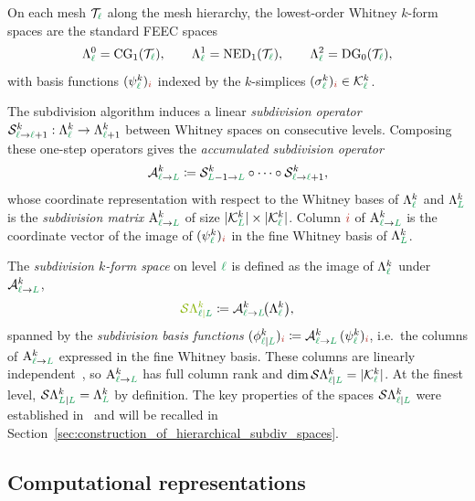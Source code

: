 \documentclass[a4paper, 12pt]{article}
\newcommand{\guidance}[1]{{\color{lime!70!black} #1}}
\newcommand{\green}{\color{ForestGreen}}
\newcommand{\brickred}{\color{BrickRed}}
\newcommand{\T}{\mathcal{T}}
\newcommand{\K}{\mathcal{K}}
\newcommand{\simplexname}{\sigma}
\newcommand{\simplex}[3]{\freeQ{\simplexname}{#1}{#2}{#3}}
\newcommand{\coarseIdxone}{{\brickred i}}
\renewcommand{\l}{{\green\ell}}
\renewcommand{\L}{{\green L}}
\newcommand{\constrQ}[5]{ ( {#1}^{#2}_{#3 \vert #4} )_{#5}} %
\newcommand{\freeQ}[4]{ ( {#1}^{#2}_{#3} )_{#4}}
\newcommand{\Sop}[3]{\mathcal{S}^{#1}_{{#2} \to {#3}}}
\newcommand{\Aop}[3]{\mathcal{A}^{#1}_{{#2} \to {#3}}}
\newcommand{\Amat}[3]{\mathbf{\mathrm{A}}^{#1}_{#2 \to #3}}
\newcommand{\FEECspace}[2]{\Lambda^{#1}_{#2}}
\newcommand{\FEECbasis}{\psi}
\newcommand{\SDFspace}[3]{\mathcal{S}\Lambda^{#1}_{#2 \vert #3}}
\newcommand{\SDFbasis}{\phi}
\newcommand{\sumdimlk}[2]{\vert \K^{#2}_{#1} \vert}
\theoremstyle{definition}
\theoremstyle{plain}
\numberwithin{equation}{section}
\begin{document}
On each mesh $\T_\l$ along the mesh hierarchy, the lowest-order Whitney $k$-form spaces are the standard FEEC spaces~\citep{Arnold.2006}
\begin{equation}
    \label{eq:whitney_spaces}
    \FEECspace{0}{\l} = \mathrm{CG}_1(\T_\l), \qquad \FEECspace{1}{\l} = \mathrm{NED}_1(\T_\l), \qquad \FEECspace{2}{\l} = \mathrm{DG}_0(\T_\l),
\end{equation}
with basis functions $\freeQ{\FEECbasis}{k}{\l}{\coarseIdxone}$ indexed by the $k$-simplices $\simplex{k}{\l}{\coarseIdxone} \in \K^k_\l$.

The subdivision algorithm induces a linear \emph{subdivision operator} $\Sop{k}{\l}{\l+1}: \FEECspace{k}{\l} \to \FEECspace{k}{\l+1}$ between Whitney spaces on consecutive levels. Composing these one-step operators gives the \emph{accumulated subdivision operator}
\begin{equation}
    \Aop{k}{\l}{\L} \coloneqq \Sop{k}{\L-1}{\L} \circ \cdots \circ \Sop{k}{\l}{\l+1},
\end{equation}
whose coordinate representation with respect to the Whitney bases of $\FEECspace{k}{\l}$ and $\FEECspace{k}{\L}$ is the \emph{subdivision matrix} $\Amat{k}{\l}{\L}$ of size $|\K^k_\L| \times |\K^k_\l|$. Column $\coarseIdxone$ of $\Amat{k}{\l}{\L}$ is the coordinate vector of the image of $\freeQ{\FEECbasis}{k}{\l}{\coarseIdxone}$ in the fine Whitney basis of $\FEECspace{k}{\L}$.

The \emph{subdivision $k$-form space} on level $\l$ is defined as the image of $\FEECspace{k}{\l}$ under $\Aop{k}{\l}{\L}$,
\begin{equation}
    \label{def:uniform_spaces_as_image_of_subdiv_operator}
    \guidance{\SDFspace{k}{\l}{\L}} \coloneqq \Aop{k}{\l}{\L}\!\big(\FEECspace{k}{\l}\big),
\end{equation}
spanned by the \emph{subdivision basis functions} $\constrQ{\SDFbasis}{k}{\l}{\L}{\coarseIdxone} \coloneqq \Aop{k}{\l}{\L}\, \freeQ{\FEECbasis}{k}{\l}{\coarseIdxone}$, i.e.\ the columns of $\Amat{k}{\l}{\L}$ expressed in the fine Whitney basis. \guidance{These columns are linearly independent~\citep{Piel.2026}, so $\Amat{k}{\l}{\L}$ has full column rank and $\dim \SDFspace{k}{\l}{\L} = \sumdimlk{\l}{k}$.} At the finest level, $\SDFspace{k}{\L}{\L} = \FEECspace{k}{\L}$ by definition. The key properties of the spaces $\SDFspace{k}{\l}{\L}$ were established in~\cite{Piel.2026} and will be recalled in Section~\ref{sec:construction_of_hierarchical_subdiv_spaces}.

\subsection{Computational representations}
\label{subsec:computational_representations}
\end{document}
